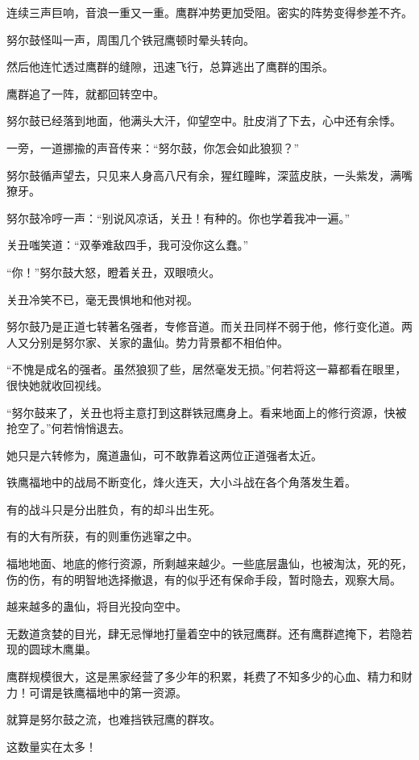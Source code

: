 \begin{this_body}
连续三声巨响，音浪一重又一重。鹰群冲势更加受阻。密实的阵势变得参差不齐。

努尔鼓怪叫一声，周围几个铁冠鹰顿时晕头转向。

然后他连忙透过鹰群的缝隙，迅速飞行，总算逃出了鹰群的围杀。

鹰群追了一阵，就都回转空中。

努尔鼓已经落到地面，他满头大汗，仰望空中。肚皮消了下去，心中还有余悸。

一旁，一道挪揄的声音传来：“努尔鼓，你怎会如此狼狈？”

努尔鼓循声望去，只见来人身高八尺有余，猩红瞳眸，深蓝皮肤，一头紫发，满嘴獠牙。

努尔鼓冷哼一声：“别说风凉话，关丑！有种的。你也学着我冲一遍。”

关丑嗤笑道：“双拳难敌四手，我可没你这么蠢。”

“你！”努尔鼓大怒，瞪着关丑，双眼喷火。

关丑冷笑不已，毫无畏惧地和他对视。

努尔鼓乃是正道七转著名强者，专修音道。而关丑同样不弱于他，修行变化道。两人又分别是努尔家、关家的蛊仙。势力背景都不相伯仲。

“不愧是成名的强者。虽然狼狈了些，居然毫发无损。”何若将这一幕都看在眼里，很快她就收回视线。

“努尔鼓来了，关丑也将主意打到这群铁冠鹰身上。看来地面上的修行资源，快被抢空了。”何若悄悄退去。

她只是六转修为，魔道蛊仙，可不敢靠着这两位正道强者太近。

铁鹰福地中的战局不断变化，烽火连天，大小斗战在各个角落发生着。

有的战斗只是分出胜负，有的却斗出生死。

有的大有所获，有的则重伤逃窜之中。

福地地面、地底的修行资源，所剩越来越少。一些底层蛊仙，也被淘汰，死的死，伤的伤，有的明智地选择撤退，有的似乎还有保命手段，暂时隐去，观察大局。

越来越多的蛊仙，将目光投向空中。

无数道贪婪的目光，肆无忌惮地打量着空中的铁冠鹰群。还有鹰群遮掩下，若隐若现的圆球木鹰巢。

鹰群规模很大，这是黑家经营了多少年的积累，耗费了不知多少的心血、精力和财力！可谓是铁鹰福地中的第一资源。

就算是努尔鼓之流，也难挡铁冠鹰的群攻。

这数量实在太多！


\end{this_body}
